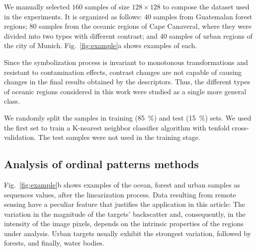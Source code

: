 \documentclass[journal]{IEEEtran}
\begin{document}
We manually selected $160$ samples of size $128 \times 128$ to compose the dataset used in the experiments.
It is organized as follows:
$40$ samples from Guatemalan forest regions;
$80$ samples from the oceanic regions of Cape Canaveral, where they were divided into two types with different contrast; and
$40$ samples of urban regions of the city of Munich.
Fig.~\ref{fig:example}a shows examples of each.

Since the symbolization process is invariant to monotonous transformations and resistant to contamination effects, contrast changes are not capable of causing changes in the final results obtained by the descriptors.
Thus, the different types of oceanic regions considered in this work were studied as a single more general class.

We randomly split the samples in training (\SI{85}{\percent}) and test (\SI{15}{\percent}) sets.
We used the first set to train a K-nearest neighbor classifier algorithm with tenfold cross-validation.
The test samples were not used in the training stage.

\subsection{Analysis of ordinal patterns methods}

Fig.~\ref{fig:example}b shows examples of the ocean, forest and urban samples as sequences values, after the linearization process.
Data resulting from remote sensing have a peculiar feature that justifies the application in this article:
The variation in the magnitude of the targets' backscatter and, consequently, in the intensity of the image pixels, depends on the intrinsic properties of the regions under analysis.
Urban targets usually exhibit the strongest variation, followed by forests, and finally, water bodies.
\end{document}
